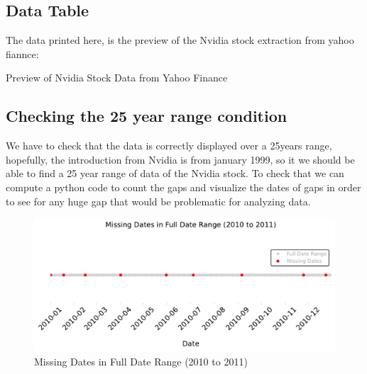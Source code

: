 \documentclass{article}
\begin{document}
\subsection{Data Table}
The data printed here, is the preview of the Nvidia stock extraction from yahoo fiannce:
\begin{table}[h!]
    \centering
      
    \caption{Preview of Nvidia Stock Data from Yahoo Finance}
    \label{tab:nvidia_stock_preview}
\end{table}



\subsection{Checking the 25 year range condition}

We have to check that the data is correctly displayed over a 25years range, hopefully, 
the introduction from Nvidia is from january 1999, so it we should be able to find a 25 year range
of data of the Nvidia stock. To check that we can compute a python code to count the gaps and visualize 
the dates of gaps in order to see for any huge gap that would be problematic for analyzing data.

\begin{figure}[H]
    \centering
    \includegraphics[width=\textwidth]{Img/MissingDates(2010_to_2011).pdf}
    \caption{Missing Dates in Full Date Range (2010 to 2011)}
    \label{fig:missing_dates}
\end{figure}

\appendix


\end{document}
